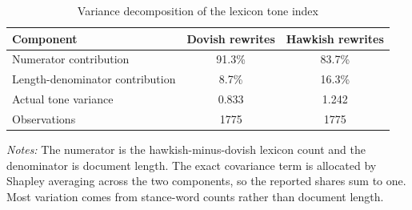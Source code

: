 \begin{table}[htbp]
\color{revisionred}
\centering
\begin{threeparttable}
\caption{Variance decomposition of the lexicon tone index}
\label{tab:tone-variance-decomposition}
\begin{footnotesize}
\begin{tabular}{lcc}
\toprule
Component & Dovish rewrites & Hawkish rewrites \\
\midrule
Numerator contribution & 91.3\% & 83.7\% \\
Length-denominator contribution & 8.7\% & 16.3\% \\
Actual tone variance & 0.833 & 1.242 \\
Observations & 1775 & 1775 \\
\bottomrule
\end{tabular}
\begin{tablenotes}[flushleft]
\scriptsize
\item \textit{Notes:} The numerator is the hawkish-minus-dovish lexicon count and the denominator is document length. The exact covariance term is allocated by Shapley averaging across the two components, so the reported shares sum to one. Most variation comes from stance-word counts rather than document length.
\end{tablenotes}
\end{footnotesize}
\end{threeparttable}
\end{table}
